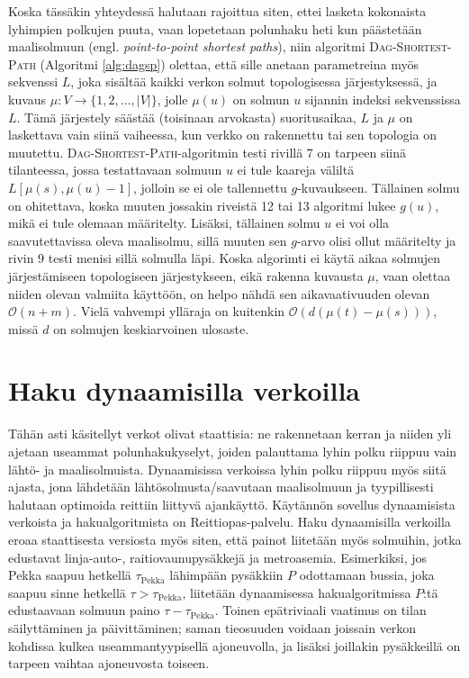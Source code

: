 \documentclass[finnish]{tktltiki2}
\theoremstyle{definition}
\theoremstyle{remark}
\begin{document}
Koska tässäkin yhteydessä halutaan rajoittua siten, ettei lasketa kokonaista lyhimpien polkujen puuta, vaan lopetetaan polunhaku heti kun päästetään maalisolmuun (engl. \textit{point-to-point shortest paths}), niin algoritmi \textsc{Dag-Shortest-Path} (Algoritmi \ref{alg:dagsp}) olettaa, että sille anetaan parametreina myös sekvenssi $L$, joka sisältää kaikki verkon solmut topologisessa järjestyksessä, ja kuvaus $\mu \colon V \to \{ 1, 2, \dots, |V| \}$, jolle $\mu(u)$ on solmun $u$ sijannin indeksi sekvenssissa $L$. Tämä järjestely säästää (toisinaan arvokasta) suoritusaikaa, $L$ ja $\mu$ on laskettava vain siinä vaiheessa, kun verkko on rakennettu tai sen topologia on muutettu. \textsc{Dag-Shortest-Path}-algoritmin testi rivillä 7 on tarpeen siinä tilanteessa, jossa testattavaan solmuun $u$ ei tule kaareja väliltä $L[\mu(s), \mu(u) - 1]$, jolloin se ei ole tallennettu $g$-kuvaukseen. Tällainen solmu on ohitettava, koska muuten jossakin riveistä 12 tai 13 algoritmi lukee $g(u)$, mikä ei tule olemaan määritelty. Lisäksi, tällainen solmu $u$ ei voi olla saavutettavissa oleva maalisolmu, sillä muuten sen $g$-arvo olisi ollut määritelty ja rivin 9 testi menisi sillä solmulla läpi. Koska algorimti ei käytä aikaa solmujen järjestämiseen topologiseen järjestykseen, eikä rakenna kuvausta $\mu$, vaan olettaa niiden olevan valmiita käyttöön, on helpo nähdä sen aikavaativuuden olevan $\mathcal{O}(n + m)$. Vielä vahvempi ylläraja on kuitenkin $\mathcal{O}(d(\mu(t) - \mu(s)))$, missä $d$ on solmujen keskiarvoinen ulosaste.

\section{Haku dynaamisilla verkoilla}
Tähän asti käsitellyt verkot olivat staattisia: ne rakennetaan kerran ja niiden yli ajetaan useammat polunhakukyselyt, joiden palauttama lyhin polku riippuu vain lähtö- ja maalisolmuista. Dynaamisissa verkoissa lyhin polku riippuu myös siitä ajasta, jona lähdetään lähtösolmusta/saavutaan maalisolmuun ja tyypillisesti halutaan optimoida reittiin liittyvä ajankäyttö. Käytännön sovellus dynaamisista verkoista ja hakualgoritmista on Reittiopas-palvelu. Haku dynaamisilla verkoilla eroaa staattisesta versiosta myös siten, että painot liitetään myös solmuihin, jotka edustavat linja-auto-, raitiovaunupysäkkejä ja metroasemia. Esimerkiksi, jos Pekka saapuu hetkellä $\tau_{\text{Pekka}}$ lähimpään pysäkkiin $P$ odottamaan bussia, joka saapuu sinne hetkellä $\tau > \tau_{\text{Pekka}}$, liitetään dynaamisessa hakualgoritmissa $P$:tä edustaavaan solmuun paino $\tau - \tau_{\text{Pekka}}$. Toinen epätriviaali vaatimus on tilan säilyttäminen ja päivittäminen; saman tieosuuden voidaan joissain verkon kohdissa kulkea useammantyypisellä ajoneuvolla, ja lisäksi joillakin pysäkkeillä on tarpeen vaihtaa ajoneuvosta toiseen.
\end{document}
